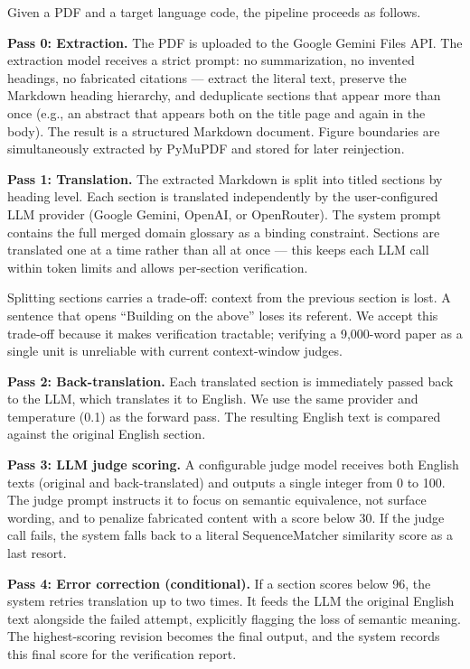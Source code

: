\documentclass{article}
\begin{document}
Given a PDF and a target language code, the pipeline proceeds as follows.

\textbf{Pass 0: Extraction.} The PDF is uploaded to the Google Gemini Files API. The extraction model receives a strict prompt: no summarization, no invented headings, no fabricated citations --- extract the literal text, preserve the Markdown heading hierarchy, and deduplicate sections that appear more than once (e.g., an abstract that appears both on the title page and again in the body). The result is a structured Markdown document. Figure boundaries are simultaneously extracted by PyMuPDF and stored for later reinjection.

\textbf{Pass 1: Translation.} The extracted Markdown is split into titled sections by heading level. Each section is translated independently by the user-configured LLM provider (Google Gemini, OpenAI, or OpenRouter). The system prompt contains the full merged domain glossary as a binding constraint. Sections are translated one at a time rather than all at once --- this keeps each LLM call within token limits and allows per-section verification.

Splitting sections carries a trade-off: context from the previous section is lost. A sentence that opens ``Building on the above'' loses its referent. We accept this trade-off because it makes verification tractable; verifying a 9,000-word paper as a single unit is unreliable with current context-window judges.

\textbf{Pass 2: Back-translation.} Each translated section is immediately passed back to the LLM, which translates it to English. We use the same provider and temperature (0.1) as the forward pass. The resulting English text is compared against the original English section.

\textbf{Pass 3: LLM judge scoring.} A configurable judge model receives both English texts (original and back-translated) and outputs a single integer from 0 to 100. The judge prompt instructs it to focus on semantic equivalence, not surface wording, and to penalize fabricated content with a score below 30. If the judge call fails, the system falls back to a literal SequenceMatcher similarity score as a last resort.

\textbf{Pass 4: Error correction (conditional).} If a section scores below 96, the system retries translation up to two times. It feeds the LLM the original English text alongside the failed attempt, explicitly flagging the loss of semantic meaning. The highest-scoring revision becomes the final output, and the system records this final score for the verification report.
\end{document}
